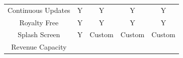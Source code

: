 \documentclass[12pt]{article}
\begin{document}
\begin{longtable}[]{@{}ccccc@{}}
\begin{minipage}[t]{0.18\columnwidth}
Continuous Updates\strut
\end{minipage} & \begin{minipage}[t]{0.18\columnwidth}\centering\strut
Y\strut
\end{minipage} & \begin{minipage}[t]{0.14\columnwidth}\centering\strut
Y\strut
\end{minipage} & \begin{minipage}[t]{0.14\columnwidth}\centering\strut
Y\strut
\end{minipage} & \begin{minipage}[t]{0.23\columnwidth}\centering\strut
Y\strut
\end{minipage}\tabularnewline
\begin{minipage}[t]{0.18\columnwidth}\centering\strut
Royalty Free\strut
\end{minipage} & \begin{minipage}[t]{0.18\columnwidth}\centering\strut
Y\strut
\end{minipage} & \begin{minipage}[t]{0.14\columnwidth}\centering\strut
Y\strut
\end{minipage} & \begin{minipage}[t]{0.14\columnwidth}\centering\strut
Y\strut
\end{minipage} & \begin{minipage}[t]{0.23\columnwidth}\centering\strut
Y\strut
\end{minipage}\tabularnewline
\begin{minipage}[t]{0.18\columnwidth}\centering\strut
Splash Screen\strut
\end{minipage} & \begin{minipage}[t]{0.18\columnwidth}\centering\strut
Y\strut
\end{minipage} & \begin{minipage}[t]{0.14\columnwidth}\centering\strut
Custom\strut
\end{minipage} & \begin{minipage}[t]{0.14\columnwidth}\centering\strut
Custom\strut
\end{minipage} & \begin{minipage}[t]{0.23\columnwidth}\centering\strut
Custom\strut
\end{minipage}\tabularnewline
\begin{minipage}[t]{0.18\columnwidth}\centering\strut
Revenue Capacity\strut
\end{minipage} & \begin{minipage}[t]{0.18\columnwidth}\centering\strut

\end{minipage}
\end{longtable}
\end{document}
